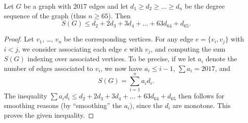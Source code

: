 \begin{lemma*}
  Let $G$ be a graph with $2017$ edges and let
  $d_1 \ge d_2 \ge \dots \ge d_n$ be the degree sequence of the graph
  (thus $n \ge 65$).
  Then \[ S(G) \le d_2 + 2d_3 + 3d_4 + \dots + 63d_{64} + d_{65}. \]
\end{lemma*}
\begin{proof}
  Let $v_1$, \dots, $v_n$ be the corresponding vertices.
  For any edge $e = \{v_i, v_j\}$ with $i < j$,
  we consider associating each edge $e$ with $v_j$,
  and computing the sum $S(G)$ indexing over associated vertices.
  To be precise, if we let $a_i$ denote the number of edges
  associated to $v_i$, we now have $a_i \le i-1$, $\sum a_i = 2017$, and
  \[ S(G) = \sum_{i=1}^n a_i d_i. \]
  The inequality
  $\sum a_i d_i \le d_2 + 2d_3 + 3d_4 + \dots + 63d_{64} + d_{65}$
  then follows for smoothing reasons
  (by ``smoothing'' the $a_i$), since the $d_i$ are monotone.
  This proves the given inequality.
\end{proof}

